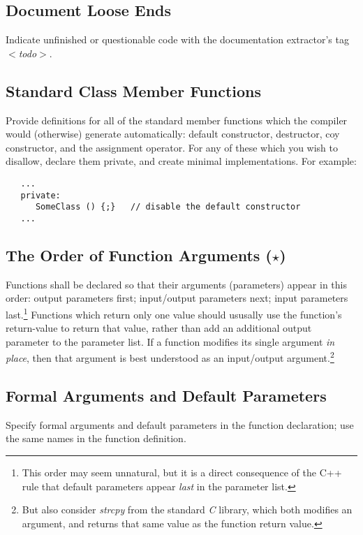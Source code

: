 \subsection {Document Loose Ends}
Indicate unfinished or questionable code with the documentation extractor's
tag {\em $<$todo$>$}.
\subsection {Standard Class Member Functions}
Provide definitions for all of the standard member functions which the
compiler would (otherwise) generate automatically:  default constructor,
destructor, coy constructor, and the assignment operator.  For any of 
these which you wish to disallow, declare them private, and create
minimal implementations.  For example:
\begin{verbatim}
   ...
   private:
      SomeClass () {;}   // disable the default constructor
   ...
\end{verbatim}
\subsection {The Order of Function Arguments ($\star$)}
Functions shall be declared so that their arguments (parameters) appear in 
this order: output parameters first; input/output parameters next; 
input parameters last.\footnote {This order may seem unnatural, but it is a 
direct consequence of the C++ rule that default parameters appear
{\em last} in the parameter list.}  Functions which return only one value 
should ususally use the function's return-value to return that value, rather
than add an additional output parameter to the parameter list.  If
a function modifies its single argument {\em in place}, then that
argument is best understood as an input/output argument.\footnote
{But also consider {\em strcpy} from the 
standard {\em C} library, which both modifies an argument, and returns 
that same value as the function return value.}
\subsection {Formal Arguments and Default Parameters}
Specify formal arguments and default parameters in the function declaration;
use the same names in the function definition.
